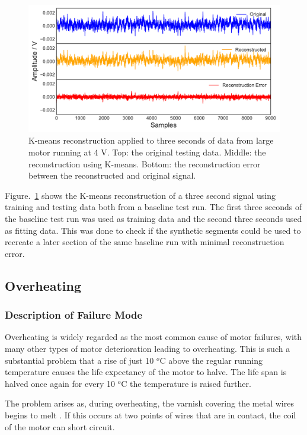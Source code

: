 \begin{figure}[t]
    \includegraphics[width=1.0\textwidth]{fig/kmeans_large_4Vnowater.pdf}
    \caption[K-means Large Motor Reconstruction No Water]{K-means reconstruction applied to three seconds of data from large motor running at 4 V. Top: the original testing data. Middle: the reconstruction using K-means. Bottom: the reconstruction error between the reconstructed and original signal.}
    \label{fig:kmeans_large4V}
\end{figure}

Figure.~\ref{fig:kmeans_large4V} shows the K-means reconstruction of a three second signal using training and testing data both from a baseline test run. The first three seconds of the baseline test run was used as training data and the second three seconds used as fitting data. This was done to check if the synthetic segments could be used to recreate a later section of the same baseline run with minimal reconstruction error. 

\subsection{Overheating}

\subsubsection{Description of Failure Mode}

Overheating is widely regarded as the most common cause of motor failures, with many other types of motor deterioration leading to overheating. This is such a substantial problem that a rise of just 10 $^o$C above the regular running temperature causes the life expectancy of the motor to halve. The life span is halved once again for every 10 $^o$C the temperature is raised further.%

The problem arises as, during overheating, the varnish covering the metal wires begins to melt \cite{wagner1993effects}. If this occurs at two points of wires that are in contact, the coil of the motor can short circuit.

